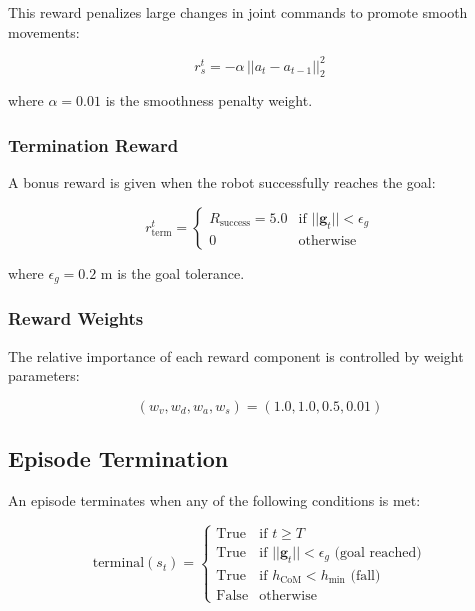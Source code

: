 \documentclass[12pt,a4paper]{article}
\begin{document}
\begin{itemize}
\begin{itemize}
This reward penalizes large changes in joint commands to promote smooth movements:

\begin{equation}
r_s^t = -\alpha \, ||a_t - a_{t-1}||_2^2
\end{equation}

where $\alpha = 0.01$ is the smoothness penalty weight.

\subsubsection{Termination Reward}

A bonus reward is given when the robot successfully reaches the goal:

\begin{equation}
r_{\text{term}}^t = \begin{cases}
R_{\text{success}} = 5.0 & \text{if } ||\mathbf{g}_t|| < \epsilon_g \\
0 & \text{otherwise}
\end{cases}
\end{equation}

where $\epsilon_g = 0.2 \text{ m}$ is the goal tolerance.

\subsubsection{Reward Weights}

The relative importance of each reward component is controlled by weight parameters:

\begin{equation}
(w_v, w_d, w_a, w_s) = (1.0, 1.0, 0.5, 0.01)
\end{equation}

\subsection{Episode Termination}

An episode terminates when any of the following conditions is met:

\begin{equation}
\text{terminal}(s_t) = \begin{cases}
\text{True} & \text{if } t \geq T \\
\text{True} & \text{if } ||\mathbf{g}_t|| < \epsilon_g \text{ (goal reached)} \\
\text{True} & \text{if } h_{\text{CoM}} < h_{\min} \text{ (fall)} \\
\text{False} & \text{otherwise}
\end{cases}
\end{equation}


\end{itemize}
\end{itemize}
\end{document}
